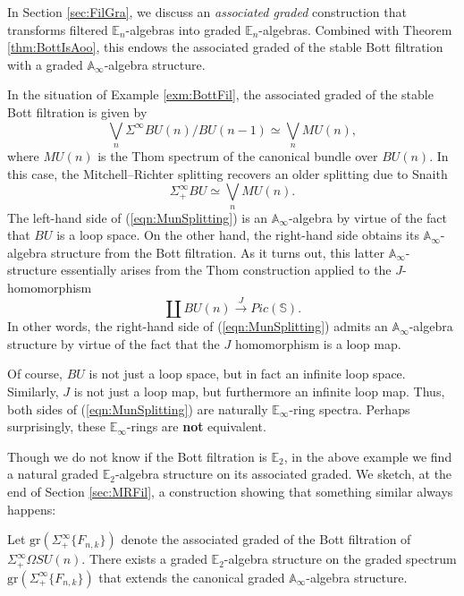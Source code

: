 In Section \ref{sec:FilGra}, we discuss an \textit{associated graded} construction that transforms filtered $\mathbb{E}_n$-algebras into graded $\mathbb{E}_n$-algebras.  Combined with Theorem \ref{thm:BottIsAoo}, this endows the associated graded of the stable Bott filtration with a graded $\mathbb{A}_\infty$-algebra structure.

\begin{exm}
In the situation of Example \ref{exm:BottFil}, the associated graded of the stable Bott filtration is given by
$$\bigvee_n \Sigma^{\infty} BU(n)/BU(n-1) \simeq \bigvee_n MU(n),$$
where $MU(n)$ is the Thom spectrum of the canonical bundle over $BU(n)$.  In this case, the Mitchell--Richter splitting recovers an older splitting due to Snaith \cite{SnaithBook}
\begin{equation}\label{eqn:MunSplitting}
\Sigma^{\infty}_+ BU \simeq \bigvee_n MU(n). %
\end{equation}
The left-hand side of (\ref{eqn:MunSplitting}) is an $\mathbb{A}_\infty$-algebra by virtue of the fact that $BU$ is a loop space.  On the other hand, the right-hand side obtains its $\mathbb{A}_\infty$-algebra structure from the Bott filtration.  As it turns out, this latter $\mathbb{A}_\infty$-structure essentially arises from the Thom construction applied to the $J$-homomorphism
$$\coprod BU(n) \stackrel{J}{\longrightarrow} Pic(\mathbb{S}).$$
In other words, the right-hand side of (\ref{eqn:MunSplitting}) admits an $\mathbb{A}_\infty$-algebra structure by virtue of the fact that the $J$ homomorphism is a loop map.

Of course, $BU$ is not just a loop space, but in fact an infinite loop space.  Similarly, $J$ is not just a loop map, but furthermore an infinite loop map.  Thus, both sides of (\ref{eqn:MunSplitting}) are naturally $\mathbb{E}_\infty$-ring spectra.  Perhaps surprisingly, these $\mathbb{E}_\infty$-rings are \textbf{not} equivalent.
\end{exm}

Though we do not know if the Bott filtration is $\mathbb{E}_2$, in the above example we find a natural graded $\mathbb{E}_2$-algebra structure on its associated graded.  We sketch, at the end of Section \ref{sec:MRFil}, a construction showing that something similar always happens:

\begin{cnstr} \label{cnstr:IntroGr}
Let $\text{gr}(\Sigma^{\infty}_+\{F_{n,k}\})$ denote the associated graded of the Bott filtration of $\Sigma^{\infty}_+ \Omega SU(n)$.  There exists a graded $\mathbb{E}_2$-algebra structure on the graded spectrum $\text{gr}(\Sigma^{\infty}_+ \{F_{n,k}\})$ that extends the canonical graded $\mathbb{A}_\infty$-algebra structure.
\end{cnstr}

